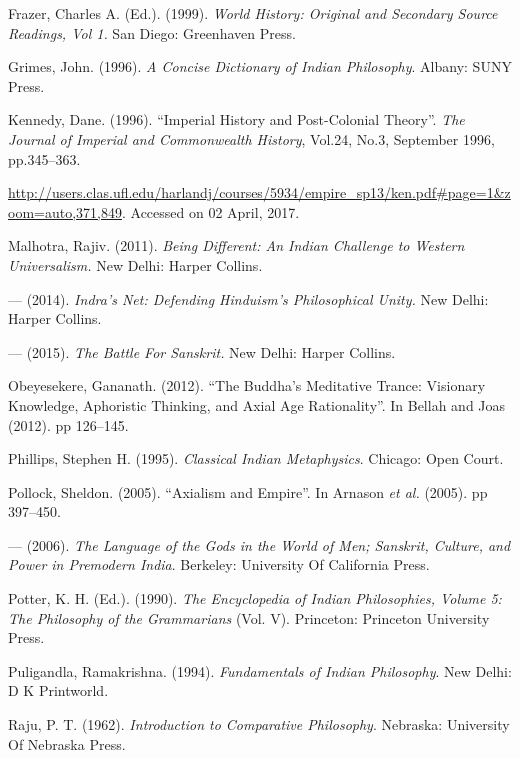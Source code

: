 \begin{thebibliography}{99}
  Frazer, Charles A. (Ed.). (1999). \textit{World History: Original and Secondary Source Readings, Vol 1.} San Diego: Greenhaven Press.

  Grimes, John. (1996). \textit{A Concise Dictionary of Indian Philosophy}. Albany: SUNY Press.

  Kennedy, Dane. (1996). “Imperial History and Post-Colonial Theory”. \textit{The Journal of Imperial and Commonwealth History}, Vol.24, No.3, September 1996, pp.345--363.

  \url{http://users.clas.ufl.edu/harlandj/courses/5934/empire_sp13/ken.pdf#page=1&zoom=auto,371,849}. Accessed on 02 April, 2017.

  Malhotra, Rajiv. (2011). \textit{Being Different: An Indian Challenge to Western Universalism.} New Delhi: Harper Collins.

  — (2014).\textit{ Indra's Net: Defending Hinduism's Philosophical Unity.} New Delhi: Harper Collins.

  — (2015). \textit{The Battle For Sanskrit.} New Delhi: Harper Collins.

  Obeyesekere, Gananath. (2012). “The Buddha’s Meditative Trance: Visionary Knowledge, Aphoristic Thinking, and Axial Age Rationality”. In Bellah and Joas (2012). pp 126--145.

  Phillips, Stephen H. (1995). \textit{Classical Indian Metaphysics}. Chicago: Open Court.

  Pollock, Sheldon. (2005). “Axialism and Empire”. In Arnason \textit{et al.} (2005). pp 397--450.

  — (2006). \textit{The Language of the Gods in the World of Men; Sanskrit, Culture, and Power in Premodern India}. Berkeley: University Of California Press.

  Potter, K. H. (Ed.). (1990). \textit{The Encyclopedia of Indian Philosophies, Volume 5: The Philosophy of the Grammarians} (Vol. V). Princeton: Princeton University Press.

  Puligandla, Ramakrishna. (1994). \textit{Fundamentals of Indian Philosophy}. New Delhi: D K Printworld.

  Raju, P. T. (1962). \textit{Introduction to Comparative Philosophy}. Nebraska: University Of Nebraska Press.


\end{thebibliography}
